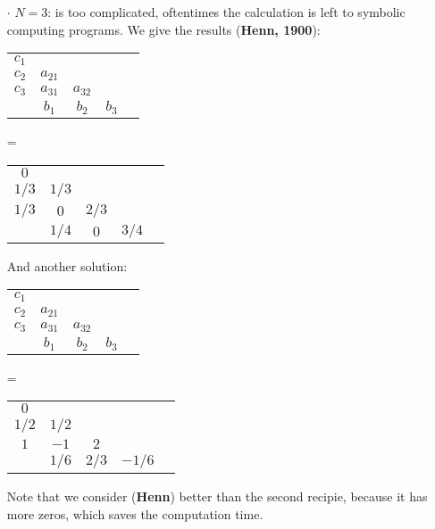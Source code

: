 \documentclass[a4paper, 11pt]{article}
\begin{document}
\begin{itemize}
	\item[$\cdot$] $N=3$: is too complicated, oftentimes the calculation is left to symbolic computing programs. We give the results (\textbf{Henn, 1900}):
		\begin{center}
		\begin{tabular}{c|cccc}
		$c_1$ \\
		$c_2$ & $a_{21}$ \\
		$c_3$ & $a_{31}$ & $a_{32}$\\
		\hline
		 & $b_1$ & $b_2$ & $b_3$ & 
		\end{tabular}  = 
		\begin{tabular}{c|cccc}
		$0$ \\
		$1/3$ & $1/3$ \\
		$1/3$ & $0$ & $2/3$\\
		\hline
		 & $1/4$ & $0$ & $3/4$ & 
		\end{tabular} 
	\end{center}
	And another solution:
	\begin{center}
		\begin{tabular}{c|cccc}
		$c_1$ \\
		$c_2$ & $a_{21}$ \\
		$c_3$ & $a_{31}$ & $a_{32}$\\
		\hline
		 & $b_1$ & $b_2$ & $b_3$ & 
		\end{tabular}  = 
		\begin{tabular}{c|cccc}
		$0$ \\
		$1/2$ & $1/2$ \\
		$1$ & $-1$ & $2$\\
		\hline
		 & $1/6$ & $2/3$ & $-1/6$ & 
		\end{tabular} 
	\end{center}
	Note that we consider (\textbf{Henn}) better than the second recipie, because it has more zeros, which saves the computation time.


\end{itemize}
\end{document}
